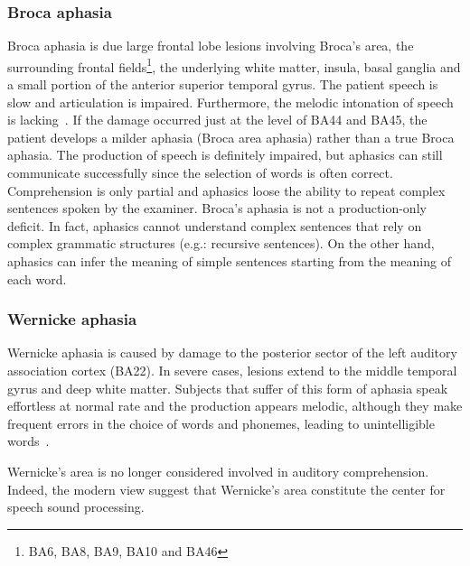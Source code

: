 \subsubsection{Broca aphasia}
\label{sec:speech:language:aphasias:broca}
Broca aphasia is due large frontal lobe lesions involving Broca's area, the
surrounding frontal fields\footnote{BA6, BA8, BA9, BA10 and BA46}, the
underlying white matter, insula, basal ganglia and a small portion of the
anterior superior temporal gyrus. The patient speech is slow and articulation is
impaired. Furthermore, the melodic intonation of speech is
lacking~\citep{kandel.schwartz.jessel:2000}.
If the damage occurred just at the level of BA44 and BA45, the patient develops
a milder aphasia (Broca area aphasia) rather than a true Broca aphasia.
The production of speech is definitely impaired, but aphasics can still
communicate successfully since the selection of words is often correct.
Comprehension is only partial and aphasics loose the ability to repeat complex
sentences spoken by the examiner.
Broca's aphasia is not a production-only deficit. In fact, aphasics cannot
understand complex sentences that rely on complex grammatic structures
(e.g.: recursive sentences). On the other hand, aphasics can infer the meaning 
of simple sentences starting from the meaning of each word.
\subsubsection{Wernicke aphasia}
\label{sec:speech:language:aphasias:wernicke}
Wernicke aphasia is caused by damage to the posterior sector of the left
auditory association cortex (BA22).
In severe cases, lesions extend to the middle temporal gyrus and deep white
matter.
Subjects that suffer of this form of aphasia speak effortless at normal rate 
and the production appears melodic, although they make frequent errors in the 
choice of words and phonemes, leading to unintelligible
words~\citep{kandel.schwartz.jessel:2000}.

Wernicke's area is no longer considered involved in auditory comprehension.
Indeed, the modern view suggest that Wernicke's area constitute the center for 
speech sound processing. 
